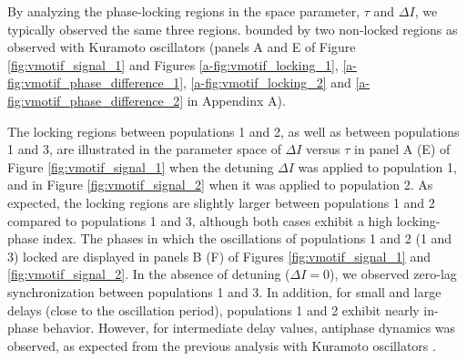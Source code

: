 \documentclass[../main.tex]{subfiles}
\begin{document}
By analyzing the phase-locking regions in the space parameter, $\tau$ and $\Delta I$, we typically observed the same three regions. bounded by two non-locked regions as observed with Kuramoto oscillators (panels A and E of Figure \ref{fig:vmotif_signal_1} and Figures \ref{a-fig:vmotif_locking_1}, \ref{a-fig:vmotif_phase_difference_1}, \ref{a-fig:vmotif_locking_2} and \ref{a-fig:vmotif_phase_difference_2} in Appendinx A).

The locking regions between populations 1 and 2, as well as between populations 1 and 3, are illustrated in the parameter space of $\Delta I$ versus $\tau$ in panel A (E) of Figure \ref{fig:vmotif_signal_1} when the detuning $\Delta I$ was applied to population 1, and in Figure \ref{fig:vmotif_signal_2} when it was applied to population 2.
As expected, the locking regions are slightly larger between populations 1 and 2 compared to populations 1 and 3, although both cases exhibit a high locking-phase index.
The phases in which the oscillations of populations 1 and 2 (1 and 3) locked are displayed in panels B (F) of Figures \ref{fig:vmotif_signal_1} and \ref{fig:vmotif_signal_2}.
In the absence of detuning ($\Delta I=0$), we observed zero-lag synchronization between populations 1 and 3.
In addition, for small and large delays (close to the oscillation period), populations 1 and 2 exhibit nearly in-phase behavior.
However, for intermediate delay values, antiphase dynamics was observed, as expected from the previous analysis with Kuramoto oscillators \citep{vicente_dynamical_2008,esfahani_zero-lag_2014,mirasso_anticipated_2017}.
\end{document}

